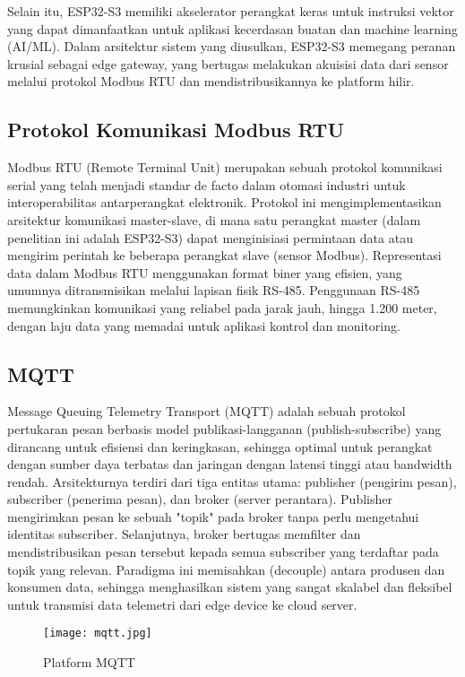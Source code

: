 \documentclass[a4paper, 12pt]{article}
\begin{document}
Selain itu, ESP32-S3 memiliki akselerator perangkat keras untuk instruksi vektor yang dapat dimanfaatkan untuk aplikasi kecerdasan buatan dan machine learning (AI/ML). Dalam arsitektur sistem yang diusulkan, ESP32-S3 memegang peranan krusial sebagai edge gateway, yang bertugas melakukan akuisisi data dari sensor melalui protokol Modbus RTU dan mendistribusikannya ke platform hilir.

\subsection{Protokol Komunikasi Modbus RTU}
Modbus RTU (Remote Terminal Unit) merupakan sebuah protokol komunikasi serial yang telah menjadi standar de facto dalam otomasi industri untuk interoperabilitas antarperangkat elektronik. Protokol ini mengimplementasikan arsitektur komunikasi master-slave, di mana satu perangkat master (dalam penelitian ini adalah ESP32-S3) dapat menginisiasi permintaan data atau mengirim perintah ke beberapa perangkat slave (sensor Modbus). Representasi data dalam Modbus RTU menggunakan format biner yang efisien, yang umumnya ditransmisikan melalui lapisan fisik RS-485. Penggunaan RS-485 memungkinkan komunikasi yang reliabel pada jarak jauh, hingga 1.200 meter, dengan laju data yang memadai untuk aplikasi kontrol dan monitoring.

\subsection{MQTT}
Message Queuing Telemetry Transport (MQTT) adalah sebuah protokol pertukaran pesan berbasis model publikasi-langganan (publish-subscribe) yang dirancang untuk efisiensi dan keringkasan, sehingga optimal untuk perangkat dengan sumber daya terbatas dan jaringan dengan latensi tinggi atau bandwidth rendah. Arsitekturnya terdiri dari tiga entitas utama: publisher (pengirim pesan), subscriber (penerima pesan), dan broker (server perantara). Publisher mengirimkan pesan ke sebuah "topik" pada broker tanpa perlu mengetahui identitas subscriber. Selanjutnya, broker bertugas memfilter dan mendistribusikan pesan tersebut kepada semua subscriber yang terdaftar pada topik yang relevan. Paradigma ini memisahkan (decouple) antara produsen dan konsumen data, sehingga menghasilkan sistem yang sangat skalabel dan fleksibel untuk transmisi data telemetri dari edge device ke cloud server.

\begin{figure}[H]
    \centering
    \texttt{[image: mqtt.jpg]} 
    \caption{Platform MQTT}
\end{figure}
\end{document}
